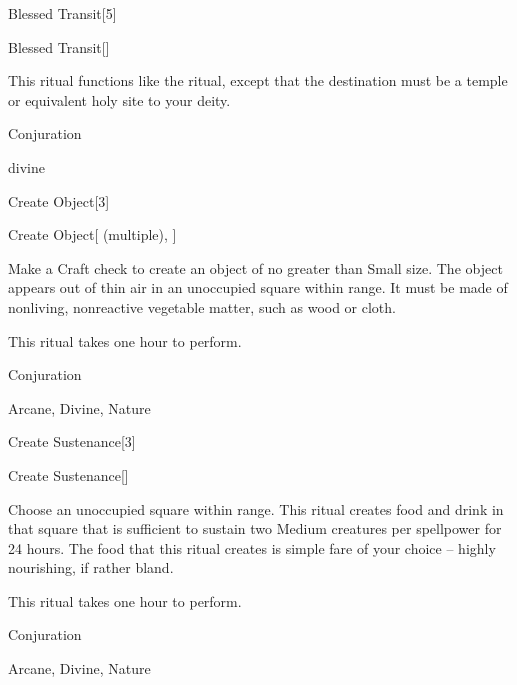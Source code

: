 \begin{spellsection}{Blessed Transit}[5]


\begin{ability}{Blessed Transit}[]

This ritual functions like the  ritual, except that the destination must be a temple or equivalent holy site to your deity.

\end{ability}




 Conjuration

 divine
\end{spellsection}


\begin{spellsection}{Create Object}[3]


\begin{ability}{Create Object}[ (multiple), ]

Make a Craft check to create an object of no greater than Small size.
The object appears out of thin air in an unoccupied square within \rngclose range.
It must be made of nonliving, nonreactive vegetable matter, such as wood or cloth.

This ritual takes one hour to perform.

\end{ability}




 Conjuration

 Arcane, Divine, Nature
\end{spellsection}


\begin{spellsection}{Create Sustenance}[3]


\begin{ability}{Create Sustenance}[]

Choose an unoccupied square within \rngclose range.
This ritual creates food and drink in that square that is sufficient to sustain two Medium creatures per spellpower for 24 hours.
The food that this ritual creates is simple fare of your choice -- highly nourishing, if rather bland.

This ritual takes one hour to perform.

\end{ability}




 Conjuration

 Arcane, Divine, Nature
\end{spellsection}


